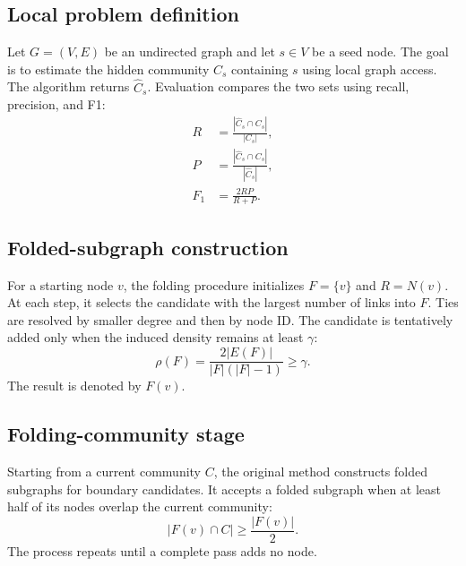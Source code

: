 \documentclass[10pt,journal,compsoc]{IEEEtran}
\begin{document}
\subsection{Local problem definition}
Let $G=(V,E)$ be an undirected graph and let $s\in V$ be a seed node. The goal
is to estimate the hidden community $C_s$ containing $s$ using local graph
access. The algorithm returns $\widehat{C}_s$. Evaluation compares the two
sets using recall, precision, and F1:
\begin{align}
 R &= \frac{|\widehat{C}_s\cap C_s|}{|C_s|},\\
 P &= \frac{|\widehat{C}_s\cap C_s|}{|\widehat{C}_s|},\\
 F_1 &= \frac{2RP}{R+P}.
\end{align}

\subsection{Folded-subgraph construction}
For a starting node $v$, the folding procedure initializes $F=\{v\}$ and
$R=N(v)$. At each step, it selects the candidate with the largest number of
links into $F$. Ties are resolved by smaller degree and then by node ID. The
candidate is tentatively added only when the induced density remains at least
$\gamma$:
\begin{equation}
 \rho(F)=\frac{2|E(F)|}{|F|(|F|-1)} \geq \gamma.
\end{equation}
The result is denoted by $F(v)$.

\subsection{Folding-community stage}
Starting from a current community $C$, the original method constructs folded
subgraphs for boundary candidates. It accepts a folded subgraph when at least
half of its nodes overlap the current community:
\begin{equation}
 |F(v)\cap C| \geq \frac{|F(v)|}{2}.
\end{equation}
The process repeats until a complete pass adds no node.
\end{document}
